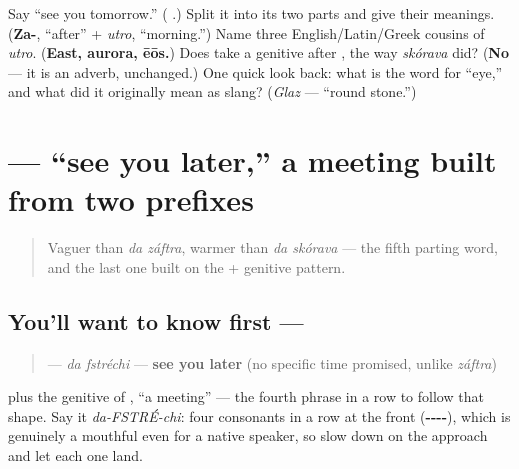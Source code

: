 \begin{tcolorbox}[breakable,colback=teal!4,colframe=teal!35!black,title={Before you move on}]
Say \textquotedblleft{}see you tomorrow.\textquotedblright{} (\textbf{ }.) Split it into its two parts and give their meanings. (\textbf{Za-}, \textquotedblleft{}after\textquotedblright{} + \emph{utro}, \textquotedblleft{}morning.\textquotedblright{}) Name three English/Latin/Greek cousins of \emph{utro}. (\textbf{East, aurora, ēōs.}) Does \emph{} take a genitive after \emph{}, the way \emph{skórava} did? (\textbf{No} — it is an adverb, unchanged.) One quick look back: what is the word for \textquotedblleft{}eye,\textquotedblright{} and what did it originally mean as slang? (\emph{Glaz} — \textquotedblleft{}round stone.\textquotedblright{})
\end{tcolorbox}
\section[\texorpdfstring{\ru{до} \ru{встречи} (da fstréchi)}{до встречи (da fstréchi)}]{  — \textquotedblleft{}see you later,\textquotedblright{} a meeting built from two prefixes}

\label{lesson:RU-C11-do-vstrechi}



\begin{quote}
Vaguer than \emph{da záftra}, warmer than \emph{da skórava} — the fifth parting word, and the last one built on the \emph{} + genitive pattern.
\end{quote}

\subsection*{You'll want to know first —  }
\begin{quote}
\textbf{ } — \emph{da fstréchi} — \textbf{see you later} (no specific time promised, unlike \emph{záftra})
\end{quote}

\emph{} plus the genitive of \textbf{}, \textquotedblleft{}a meeting\textquotedblright{} — the fourth phrase in a row to follow that shape. Say it \emph{da-FSTRÉ-chi}: four consonants in a row at the front (\textbf{----}), which is genuinely a mouthful even for a native speaker, so slow down on the approach and let each one land.

